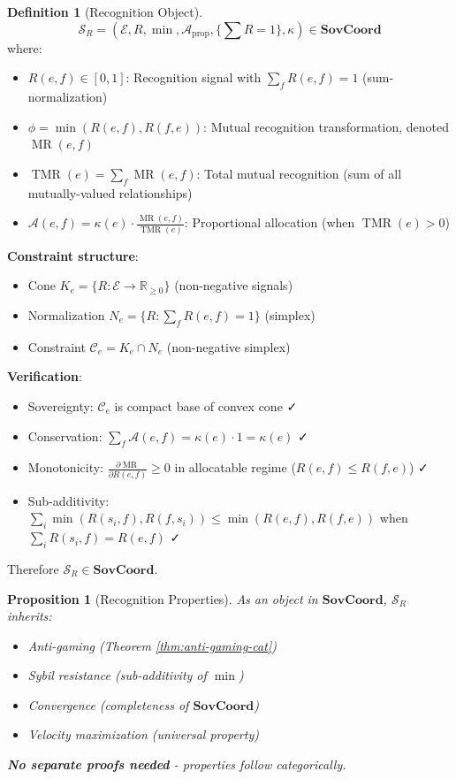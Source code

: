 \documentclass[11pt,a4paper]{article}
\newtheorem{proposition}[theorem]{Proposition}
\theoremstyle{definition}
\newtheorem{definition}[theorem]{Definition}
\theoremstyle{remark}
\newcommand{\E}{\mathcal{E}}
\newcommand{\A}{\mathcal{A}}
\newcommand{\C}{\mathcal{C}}
\newcommand{\SovCoord}{\mathbf{SovCoord}}
\DeclareMathOperator{\MR}{MR}
\DeclareMathOperator{\TMR}{TMR}
\begin{document}
\begin{definition}[Recognition Object]
\[ \mathcal{S}_R = (\E, R, \min, \A_{\text{prop}}, \{\sum R = 1\}, \kappa) \in \SovCoord \]
where:
\begin{itemize}
\item $R(e,f) \in [0,1]$: Recognition signal with $\sum_f R(e,f) = 1$ (sum-normalization)
\item $\phi = \min(R(e,f), R(f,e))$: Mutual recognition transformation, denoted $\MR(e,f)$
\item $\TMR(e) = \sum_f \MR(e,f)$: Total mutual recognition (sum of all mutually-valued relationships)
\item $\A(e,f) = \kappa(e) \cdot \frac{\MR(e,f)}{\TMR(e)}$: Proportional allocation (when $\TMR(e) > 0$)
\end{itemize}

\textbf{Constraint structure}:
\begin{itemize}
\item Cone $K_e = \{R: \E \to \mathbb{R}_{\ge 0}\}$ (non-negative signals)
\item Normalization $N_e = \{R : \sum_f R(e,f) = 1\}$ (simplex)
\item Constraint $\C_e = K_e \cap N_e$ (non-negative simplex)
\end{itemize}

\textbf{Verification}: 
\begin{itemize}
\item Sovereignty: $\C_e$ is compact base of convex cone ✓
\item Conservation: $\sum_f \A(e,f) = \kappa(e) \cdot 1 = \kappa(e)$ ✓
\item Monotonicity: $\frac{\partial \MR}{\partial R(e,f)} \ge 0$ in allocatable regime ($R(e,f) \le R(f,e)$) ✓
\item Sub-additivity: $\sum_i \min(R(s_i,f), R(f,s_i)) \le \min(R(e,f), R(f,e))$ when $\sum_i R(s_i,f) = R(e,f)$ ✓
\end{itemize}

Therefore $\mathcal{S}_R \in \SovCoord$.
\end{definition}

\begin{proposition}[Recognition Properties]
As an object in $\SovCoord$, $\mathcal{S}_R$ inherits:
\begin{itemize}
\item Anti-gaming (Theorem \ref{thm:anti-gaming-cat})
\item Sybil resistance (sub-additivity of $\min$)
\item Convergence (completeness of $\SovCoord$)
\item Velocity maximization (universal property)
\end{itemize}

\textbf{No separate proofs needed} - properties follow categorically.
\end{proposition}
\end{document}
